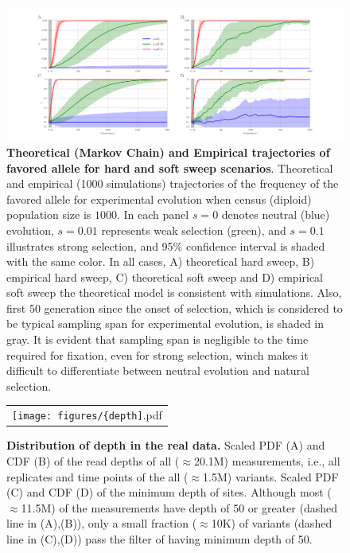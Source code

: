 \documentclass[11pt]{article}
\begin{document}
\begin{figure}[H]
	\includegraphics[trim=1in 0.1in 1in 
	0.1in,clip,width=\textwidth]{figures/AF.pdf}
	\caption{{\bf Theoretical (Markov Chain) and Empirical trajectories of 
	favored allele for hard and soft sweep scenarios}. 
		Theoretical and empirical (1000 simulations) trajectories of the 
		frequency of the favored 
		allele for experimental evolution when census (diploid) population size 
		is $1000$. In each panel $s=0$ denotes neutral (blue) evolution, 
		$s=0.01$ represents weak selection (green), and $s=0.1$ illustrates 
		strong selection, and 95\% confidence interval is shaded with the same 
		color. In all cases, A) theoretical hard sweep, B) empirical hard 
		sweep, C) theoretical soft sweep and D) empirical soft sweep the 
		theoretical model is consistent with simulations.
		Also, first 50 generation since the onset of selection, which is 
		considered to be typical sampling span for experimental evolution, is 
		shaded in gray. It is evident that sampling span is negligible to the 
		time required for fixation, even for strong selection, winch makes it 
		difficult to differentiate between neutral evolution and natural 
		selection.
}
	\label{fig:sweep}
\end{figure}

\begin{figure}[H]
	\centering
	\begin{tabular}{c}
		\texttt{[image: figures/\{depth]}.pdf}
	\end{tabular}
	\caption{ {\bf Distribution of depth in the real data.}
		 Scaled PDF (A) and CDF (B) of the read depths of all ($\approx$20.1M) 
		 measurements, i.e., all replicates and time points of the all 
		 ($\approx$1.5M) variants.
		 Scaled PDF (C) and CDF (D) of the minimum depth of sites. Although 
		 most ($\approx$11.5M) of the measurements have depth of 50 or greater 
		 (dashed line in (A),(B)), only a small fraction ($\approx$10K) of 
		 variants (dashed line in (C),(D)) pass the filter of having minimum 
		 depth of 50.}  
	\label{fig:depth}
\end{figure}
\end{document}
